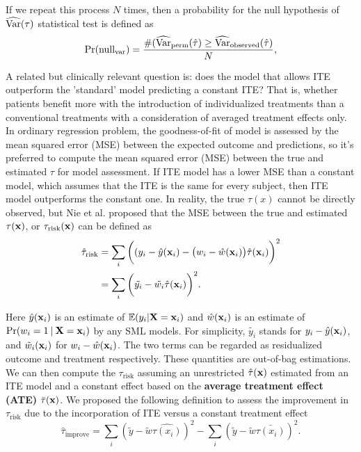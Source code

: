     If we repeat this process $N$ times, then a probability for the null hypothesis of $\operatorname{\widehat{Var}}(\tau)$ statistical test is defined as 
    \begin{equation}
      \Pr (\mathrm{null_{var}}) = \frac{\#(\operatorname{\widehat{Var}}_\mathrm{perm}(\hat{\tau})\geq \operatorname{\widehat{Var}}_\mathrm{observed}(\hat{\tau})}{N},
    \end{equation}
    
    A related but clinically relevant question is: does the model that allows ITE outperform the 'standard' model predicting a constant ITE? That is, whether patients benefit more with the introduction of individualized treatments than a conventional treatments with a consideration of averaged treatment effects only. In ordinary regression problem, the goodness-of-fit of model is assessed by the mean squared error (MSE) between the expected outcome and predictions, so it's preferred to compute the mean squared error (MSE) between the true and estimated $\tau$ for model assessment. If  ITE model has a lower MSE than a constant model, which assumes that the ITE is the same for every subject, then ITE model outperforms the constant one. In reality, the true $\tau(x)$ cannot be directly observed, but Nie et al. \cite{nie2017quasi} proposed that the MSE between the true and estimated $\tau(\mathbf{x})$, or $\tau_\mathrm{risk}(\mathrm{\mathbf{x}})$ can be defined as 
    \begin{equation}
      \begin{split}
        \hat{\tau}_\mathrm{risk} & = \sum_{i} \bigg ( (y_i - \hat{y}(\mathbf{x}_i) - \big (w_i - \hat{w}(\mathbf{x}_i) \big) \hat{\tau}(\mathbf{x}_i) \bigg ) ^2 \\
        & = \sum_{i} \bigg( \tilde{y_i} - \tilde{w_i} \hat{\tau}(\mathbf{x}_i) \bigg )^2.
      \end{split}
    \end{equation}

    Here $\hat{y}(\mathbf{x}_i)$ is an estimate of $\mathbb{E}(y_i|\mathbf{X}=\mathbf{x}_i)$ and $\hat{w}(\mathbf{x}_i)$ is an estimate of $\Pr(w_i=1 \:\vert\: \mathbf{X}=\mathbf{x}_i)$ by any SML models. For simplicity, $\tilde{y_i}$ stands for $y_i - \hat{y}(\mathbf{x}_i)$, and $\tilde{w}_i (\mathbf{x}_i)$ for $w_i - \hat{w}(\mathbf{x}_i)$. The two terms can be regarded as residualized outcome and treatment respectively. These quantities are out-of-bag estimations. We can then compute the $\tau_\mathrm{risk}$ assuming an unrestricted $\hat{\tau}(\mathbf{x})$ estimated from an ITE model and a constant effect based on the \textbf{average treatment effect (ATE)} $\bar{\tau}(\mathbf{x})$. We proposed the following definition to assess the improvement in $\tau_\mathrm{risk}$ due to the incorporation of ITE versus a constant treatment effect
    \begin{equation}
      \hat{\tau}_\mathrm{improve} = \sum_{i}(\tilde{y} - \tilde{w} \hat{\tau(x_i)})^2 - \sum_{i}(\tilde{y} - \tilde{w} \bar{\tau(x_i)})^2.
    \end{equation}

